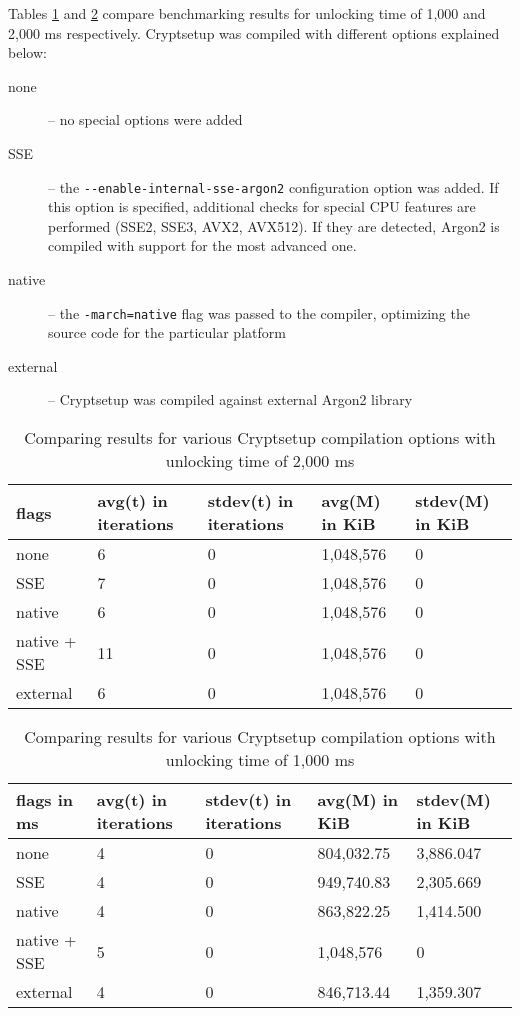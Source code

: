 \documentclass[nolof]{fithesis3}
\begin{document}
\FloatBarrier

Tables \ref{tab:comp2000} and \ref{tab:comp1000} compare benchmarking results for unlocking time of 1,000 and 2,000 ms respectively. Cryptsetup was compiled with different options explained below:

\begin{description}
\item[none] -- no special options were added

\item[SSE] -- the \verb+--enable-internal-sse-argon2+ configuration option was added. If this option is specified, additional checks for special CPU features are performed (SSE2, SSE3, AVX2, AVX512). If they are detected, Argon2 is compiled with support for the most advanced one.

\item[native] -- the \verb+-march=native+ flag was passed to the compiler, optimizing the source code for the particular platform

\item[external] -- Cryptsetup was compiled against external Argon2 library
\end{description}

\noindent
\begin{table}
\caption{Comparing results for various Cryptsetup compilation options with unlocking time of 2,000 ms}
\label{tab:comp2000}
\begin{tabularx}{\textwidth}{| l | X | X | X | X |}
\hline
flags & avg(t)  in iterations & stdev(t) in iterations & avg(M) in KiB & stdev(M) in KiB\\
\hline
none & 6 & 0 & 1,048,576 & 0\\
\hline
SSE & 7 & 0 & 1,048,576 & 0\\
\hline
native & 6 & 0 & 1,048,576 & 0\\
\hline
native + SSE & 11 & 0 & 1,048,576 & 0\\
\hline
external & 6 & 0 & 1,048,576 & 0\\
\hline
\end{tabularx}
\end{table}

\noindent
\begin{table}
\caption{Comparing results for various Cryptsetup compilation options with unlocking time of 1,000 ms}
\label{tab:comp1000}
\begin{tabularx}{\textwidth}{| l | X | X | X | X |}
\hline
flags in ms & avg(t)  in iterations & stdev(t) in iterations & avg(M) in KiB & stdev(M) in KiB\\
\hline
none & 4 & 0 & 804,032.75 & 3,886.047\\
\hline
SSE & 4 & 0 & 949,740.83 & 2,305.669\\
\hline
native & 4 & 0 & 863,822.25 & 1,414.500\\
\hline
native + SSE & 5 & 0 & 1,048,576 & 0\\
\hline
external & 4 & 0 & 846,713.44 & 1,359.307\\
\hline
\end{tabularx}
\end{table}
\end{document}

